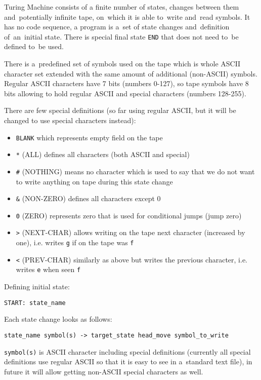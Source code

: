 \documentclass[english,shortabstract,mgr]{iithesis}
\begin{document}
Turing Machine consists of a finite number of states, changes between them
and~potentially infinite tape, on~which it is able to~write and~read symbols.
It has no code sequence, a program is a~set of state changes and~definition
of~an~initial state. There is special final state \texttt{END} that does not need
        to~be defined to~be used.

There is a~predefined set of symbols used on the tape which is whole ASCII character set
extended with the same amount of additional (non-ASCII) symbols. Regular
ASCII characters have 7 bits (numbers 0-127), so tape symbols have 8 bits
allowing to hold regular ASCII and special characters (numbers 128-255).

        There are few special definitions (so far using regular ASCII,
but it will be changed to use special characters instead):
\begin{itemize}
  \item \texttt{BLANK} which represents empty field on the tape
  \item \texttt{*} (ALL) defines all characters (both ASCII and special)
  \item \texttt{\#} (NOTHING) means no character which is used to say
                   that we do not want to write anything on tape during
                   this state change
          \item \texttt{\&} (NON-ZERO) defines all characters except 0
          \item \texttt{0} (ZERO) represents zero that is used for conditional jumps
           (jump zero)
          \item \texttt{>} (NEXT-CHAR) allows writing on the tape next character
                   (increased by one), i.e. writes \texttt{g} if on the tape
                   was \texttt{f}
  \item \texttt{<} (PREV-CHAR) similarly as above but writes the previous character,
                   i.e. writes \texttt{e} when seen \texttt{f}
\end{itemize}

Defining initial state:
\begin{verbatim}
START: state_name
\end{verbatim}

Each state change looks as follows:
\begin{verbatim}
state_name symbol(s) -> target_state head_move symbol_to_write
\end{verbatim}

\texttt{symbol(s)} is ASCII character including special definitions (currently
all special definitions use regular ASCII so that it is easy to see
in a~standard text file), in future it will allow getting non-ASCII special
characters as well.
\end{document}
